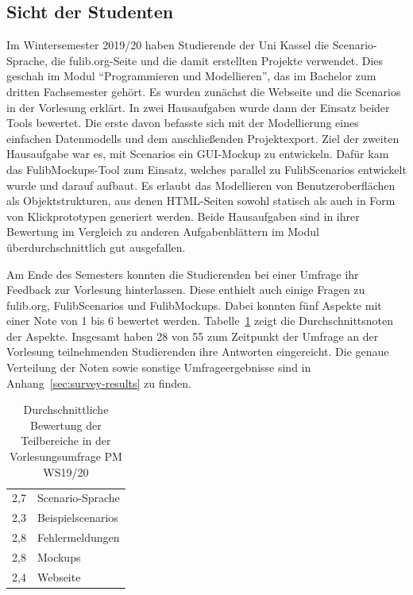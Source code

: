 \subsection{Sicht der Studenten}\label{subsec:students-view}

Im Wintersemester 2019/20 haben Studierende der Uni Kassel die Scenario-Sprache, die fulib.org-Seite und die damit erstellten Projekte verwendet.
Dies geschah im Modul ``Programmieren und Modellieren'', das im Bachelor zum dritten Fachsemester gehört.
Es wurden zunächst die Webseite und die Scenarios in der Vorlesung erklärt.
In zwei Hausaufgaben wurde dann der Einsatz beider Tools bewertet.
Die erste davon befasste sich mit der Modellierung eines einfachen Datenmodells und dem anschließenden Projektexport.
Ziel der zweiten Hausaufgabe war es, mit Scenarios ein GUI-Mockup zu entwickeln.
Dafür kam das FulibMockups-Tool zum Einsatz, welches parallel zu FulibScenarios entwickelt wurde und darauf aufbaut.
Es erlaubt das Modellieren von Benutzeroberflächen als Objektstrukturen, aus denen HTML-Seiten sowohl statisch als auch in Form von Klickprototypen generiert werden.
Beide Hausaufgaben sind in ihrer Bewertung im Vergleich zu anderen Aufgabenblättern im Modul überdurchschnittlich gut ausgefallen.

Am Ende des Semesters konnten die Studierenden bei einer Umfrage ihr Feedback zur Vorlesung hinterlassen.
Diese enthielt auch einige Fragen zu fulib.org, FulibScenarios und FulibMockups.
Dabei konnten fünf Aspekte mit einer Note von 1 bis 6 bewertet werden.
Tabelle~\ref{tab:survey-results} zeigt die Durchschnittsnoten der Aspekte.
Insgesamt haben 28 von 55 zum Zeitpunkt der Umfrage an der Vorlesung teilnehmenden Studierenden ihre Antworten eingereicht.
Die genaue Verteilung der Noten sowie sonstige Umfrageergebnisse sind in Anhang~\ref{sec:survey-results} zu finden.

\begin{table}
    \caption{Durchschnittliche Bewertung der Teilbereiche in der Vorlesungsumfrage PM WS19/20}
    \label{tab:survey-results}
    \centering
    \begin{tabular}{rl}
        \toprule
        2,7 & Scenario-Sprache \\
        2,3 & Beispielscenarios \\
        2,8 & Fehlermeldungen \\
        2,8 & Mockups \\
        2,4 & Webseite \\
        \bottomrule
    \end{tabular}
\end{table}

